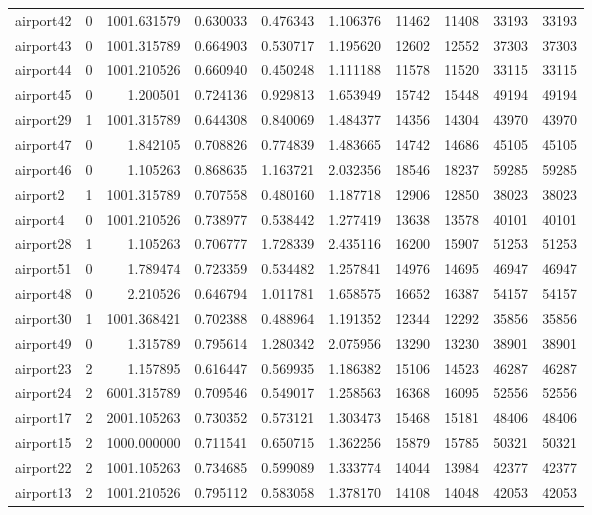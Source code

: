 \begin{longtable}{|l|r|r|r|r|r|r|r|r|r|}
airport42 & 0 & 1001.631579 & 0.630033 & 0.476343 & 1.106376 & 11462 & 11408 & 33193 & 33193 \\
airport43 & 0 & 1001.315789 & 0.664903 & 0.530717 & 1.195620 & 12602 & 12552 & 37303 & 37303 \\
airport44 & 0 & 1001.210526 & 0.660940 & 0.450248 & 1.111188 & 11578 & 11520 & 33115 & 33115 \\
airport45 & 0 & 1.200501 & 0.724136 & 0.929813 & 1.653949 & 15742 & 15448 & 49194 & 49194 \\
airport29 & 1 & 1001.315789 & 0.644308 & 0.840069 & 1.484377 & 14356 & 14304 & 43970 & 43970 \\
airport47 & 0 & 1.842105 & 0.708826 & 0.774839 & 1.483665 & 14742 & 14686 & 45105 & 45105 \\
airport46 & 0 & 1.105263 & 0.868635 & 1.163721 & 2.032356 & 18546 & 18237 & 59285 & 59285 \\
airport2 & 1 & 1001.315789 & 0.707558 & 0.480160 & 1.187718 & 12906 & 12850 & 38023 & 38023 \\
airport4 & 0 & 1001.210526 & 0.738977 & 0.538442 & 1.277419 & 13638 & 13578 & 40101 & 40101 \\
airport28 & 1 & 1.105263 & 0.706777 & 1.728339 & 2.435116 & 16200 & 15907 & 51253 & 51253 \\
airport51 & 0 & 1.789474 & 0.723359 & 0.534482 & 1.257841 & 14976 & 14695 & 46947 & 46947 \\
airport48 & 0 & 2.210526 & 0.646794 & 1.011781 & 1.658575 & 16652 & 16387 & 54157 & 54157 \\
airport30 & 1 & 1001.368421 & 0.702388 & 0.488964 & 1.191352 & 12344 & 12292 & 35856 & 35856 \\
airport49 & 0 & 1.315789 & 0.795614 & 1.280342 & 2.075956 & 13290 & 13230 & 38901 & 38901 \\
airport23 & 2 & 1.157895 & 0.616447 & 0.569935 & 1.186382 & 15106 & 14523 & 46287 & 46287 \\
airport24 & 2 & 6001.315789 & 0.709546 & 0.549017 & 1.258563 & 16368 & 16095 & 52556 & 52556 \\
airport17 & 2 & 2001.105263 & 0.730352 & 0.573121 & 1.303473 & 15468 & 15181 & 48406 & 48406 \\
airport15 & 2 & 1000.000000 & 0.711541 & 0.650715 & 1.362256 & 15879 & 15785 & 50321 & 50321 \\
airport22 & 2 & 1001.105263 & 0.734685 & 0.599089 & 1.333774 & 14044 & 13984 & 42377 & 42377 \\
airport13 & 2 & 1001.210526 & 0.795112 & 0.583058 & 1.378170 & 14108 & 14048 & 42053 & 42053 \\

\end{longtable}
